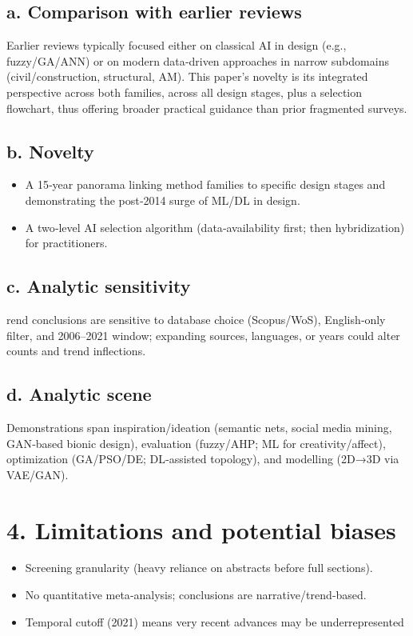 \documentclass{article}
\begin{document}
\subsection*{a. Comparison with earlier reviews }
Earlier reviews typically focused either on classical AI in design (e.g., fuzzy/GA/ANN) or on modern data‑driven approaches in narrow subdomains (civil/construction, structural, AM). This paper’s novelty is its integrated perspective across both families, across all design stages, plus a selection flowchart, thus offering broader practical guidance than prior fragmented surveys.
\subsection*{b. Novelty}
\begin{itemize}
    \item A 15‑year panorama linking method families to specific design stages and demonstrating the post‑2014 surge of ML/DL in design.
    \item A two‑level AI selection algorithm (data‑availability first; then hybridization) for practitioners.
\end{itemize}
\subsection*{c. Analytic sensitivity }
rend conclusions are sensitive to database choice (Scopus/WoS), English‑only filter, and 2006–2021 window; expanding sources, languages, or years could alter counts and trend inflections.
\subsection*{d. Analytic scene }
Demonstrations span inspiration/ideation (semantic nets, social media mining, GAN‑based bionic design), evaluation (fuzzy/AHP; ML for creativity/affect), optimization (GA/PSO/DE; DL‑assisted topology), and modelling (2D→3D via VAE/GAN).

\section*{4. Limitations and potential biases}
\begin{itemize}
    \item Screening granularity (heavy reliance on abstracts before full sections).
    \item No quantitative meta‑analysis; conclusions are narrative/trend‑based.
    \item Temporal cutoff (2021) means very recent advances may be underrepresented
\end{itemize}
\end{document}
